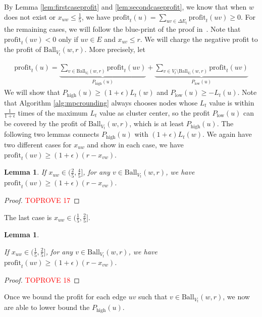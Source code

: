 \documentclass[11pt]{article}
\newtheorem{lemma}[theorem]{Lemma}
\newcommand{\ball}{\mathrm{Ball}}
\newcommand{\profit}{\mathrm{profit}}
\newcommand{\onefive}{\frac{1}{5}}
\newcommand{\twofive}{\frac{2}{5}}
\newcommand{\fourfive}{\frac{4}{5}}
\begin{document}
\begin{CJK*}{UTF8}{gbsn}
By Lemma \ref{lem:firstcaseprofit} and \ref{lem:secondcaseprofit}, we know that when $w$ does not exist or $x_{uw} \leq \onefive$, we have $\profit_t(u) = \sum_{uv \in \Delta E_t} \profit_t(uv) \geq 0$.  For the remaining cases, we will follow the blue-print of the proof in~\cite{kalhan2019correlation}. Note that $\profit_{t}(uv) < 0$ only if $uv \in E$ and $x_{uv} \leq r$. We will charge the negative profit to the profit of $\ball_{V_t}(w,r)$. More precisely, let 

\begin{align*}
    \profit_t(u) = \underbrace{\sum_{v \in \ball_{V_t}(w, r)}\profit_t(uv)}_{P_{\textrm{high}}(u)} + \underbrace{\sum_{v \in V_t \setminus \ball_{V_t}(w, r)}\profit_t(uv)}_{P_{\textrm{low}}(u)}
\end{align*}
We will show that $P_{\textrm{high}}(u) \geq (1+\epsilon) L_t(w)$ and $P_{\textrm{low}}(u) \geq -L_t(u)$. Note that Algorithm \ref{alg:mpcrounding} always chooses nodes whose $L_t$ value is within $\frac{1}{1 + \epsilon}$ times of the maximum $L_t$ value as cluster center, so the profit $P_{\textrm{low}}(u)$ can be covered by the profit of $\ball_{V_t}(w, r)$, which is at least $P_{\textrm{high}}(u)$. The following two lemmas connects $P_{\textrm{high}}(u)$ with $(1+\epsilon) L_t(w)$. We again have two different cases for $x_{uw}$ and show in each case, we have $\profit_t(uv) \geq (1+\epsilon)(r - x_{vw})$.
\begin{lemma}
\label{lem:thirdcaseprofit}
If $x_{uw} \in (\twofive, \fourfive]$, for any $v \in \ball_{V_t}(w, r)$, we have $\profit_{t}(uv) \geq (1 + \epsilon)(r - x_{vw})$.
\end{lemma}
\begin{proof}\textcolor{red}{TOPROVE 17}\end{proof}

The last case is $x_{uw} \in (\onefive, \twofive]$.
\begin{lemma}
\label{lem:fourthcaseprofit}



If $x_{uw} \in (\onefive, \twofive]$, for any $v \in \ball_{V_t}(w, r)$, we have $\profit_{t}(uv) \geq (1 + \epsilon)(r - x_{vw})$.
\end{lemma}
\begin{proof}\textcolor{red}{TOPROVE 18}\end{proof}

Once we bound the profit for each edge $uv$ such that $v \in \ball_{V_t}(w, r)$, we now are able to lower bound the $P_{\textrm{high}}(u)$.


\end{CJK*}
\end{document}
